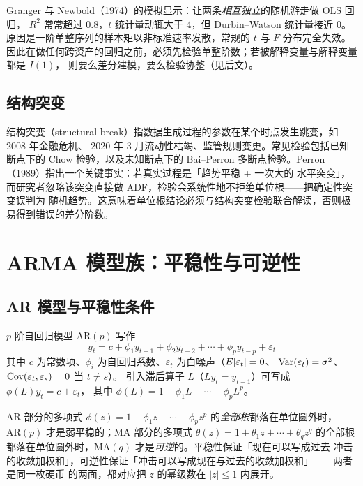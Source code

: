 \begin{warningbox}
Granger 与 Newbold（1974）的模拟显示：让两条\emph{相互独立}的随机游走做 OLS 回归，
$R^2$ 常常超过 0.8，$t$ 统计量动辄大于 4，但 Durbin--Watson 统计量接近 0。
原因是一阶单整序列的样本矩以非标准速率发散，常规的 $t$ 与 $F$ 分布完全失效。
因此在做任何跨资产的回归之前，必须先检验单整阶数；若被解释变量与解释变量都是 $I(1)$，
则要么差分建模，要么检验协整（见后文）。
\end{warningbox}

\subsection{结构突变}

结构突变（structural break）指数据生成过程的参数在某个时点发生跳变，如 2008 年金融危机、
2020 年 3 月流动性枯竭、监管规则变更。常见检验包括已知断点下的 Chow 检验，以及未知断点下的
Bai--Perron 多断点检验。Perron（1989）指出一个关键事实：若真实过程是「趋势平稳 + 一次大的
水平突变」，而研究者忽略该突变直接做 ADF，检验会系统性地不拒绝单位根——把确定性突变误判为
随机趋势。这意味着单位根结论必须与结构突变检验联合解读，否则极易得到错误的差分阶数。

\section{ARMA 模型族：平稳性与可逆性}

\subsection{AR 模型与平稳性条件}

$p$ 阶自回归模型 $\mathrm{AR}(p)$ 写作
\begin{equation}\label{eq:09-ar}
  y_t=c+\phi_1y_{t-1}+\phi_2y_{t-2}+\cdots+\phi_py_{t-p}+\varepsilon_t
\end{equation}
其中 $c$ 为常数项、$\phi_i$ 为自回归系数、$\varepsilon_t$ 为白噪声（$E[\varepsilon_t]=0$、
$\operatorname{Var}(\varepsilon_t)=\sigma^2$、$\operatorname{Cov}(\varepsilon_t,\varepsilon_s)=0$ 当 $t\ne s$）。
引入滞后算子 $L$（$Ly_t=y_{t-1}$）可写成 $\phi(L)y_t=c+\varepsilon_t$，
其中 $\phi(L)=1-\phi_1L-\cdots-\phi_pL^p$。

\begin{keybox}[平稳性条件与可逆性条件的对偶]\label{key:09-duality}
AR 部分的多项式 $\phi(z)=1-\phi_1z-\cdots-\phi_pz^p$ 的\emph{全部根}都落在单位圆外时，
$\mathrm{AR}(p)$ 才是弱平稳的；MA 部分的多项式 $\theta(z)=1+\theta_1z+\cdots+\theta_qz^q$
的全部根都落在单位圆外时，$\mathrm{MA}(q)$ 才是\emph{可逆}的。平稳性保证「现在可以写成过去
冲击的收敛加权和」，可逆性保证「冲击可以写成现在与过去的收敛加权和」——两者是同一枚硬币
的两面，都对应把 $z$ 的幂级数在 $|z|\le 1$ 内展开。
\end{keybox}

